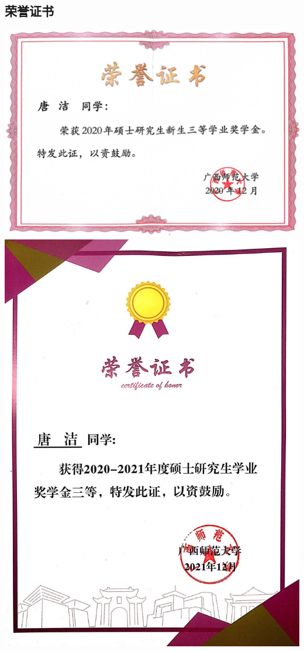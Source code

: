 \documentclass[UFT8]{ctexart}%
\begin{document}
\subsection{荣誉证书}
\begin{center}
 \includegraphics[scale=0.22]{figs/2020-12.png }
  \includegraphics[scale=0.15]{figs/2021-12.png }

\end{center}
\end{document}
